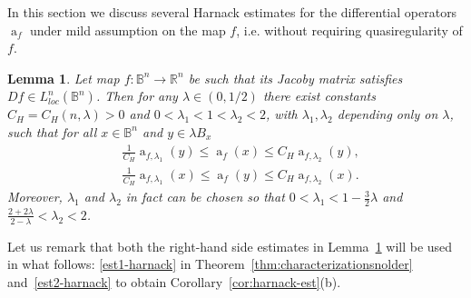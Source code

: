 \documentclass[11pt,a4paper,reqno]{amsart}
\newtheorem{lem}[theorem]{Lemma}
\theoremstyle{definition}
\renewcommand{\a}{\operatorname{a}}
\newcommand{\B}{\mathbb{B}^n}
\newcommand{\R}{\mathbb{R}}
\numberwithin{komcounter}{section}
\begin{document}
In this section we discuss several Harnack estimates for the differential operators $\a_f$ under mild assumption on the map $f$, i.e. without requiring quasiregularity of $f$. 

\begin{lem}\label{lem:harnack}
	Let map $f:\B\rightarrow \R^n$ be such that its Jacoby matrix satisfies ${D\!f \in L^n_{loc}(\B)}$. Then for any $\lambda \in (0,1/2 )$ there exist constants $C_H=C_H(n, \lambda)>0$ and $0<\lambda_1<1<\lambda_2<2$, with $\lambda_1, \lambda_2$ depending only on $\lambda$, such that for all $x\in\B$ and $y\in\lambda B_x$
	\begin{align}
		& \frac{1}{C_H} \a_{f,\lambda_1}(y)\leq \a_f(x)\leq C_H\a_{f,\lambda_2}(y), \label{est1-harnack}\\
		& \frac{1}{C_H} \a_{f,\lambda_1}(x)\leq \a_f(y)\leq C_H\a_{f,\lambda_2}(x). \label{est2-harnack}
	\end{align}
Moreover, $\lambda_1$ and $\lambda_2$ in fact can be chosen so that $0<\lambda_1<1-\frac32\lambda$ and $\frac{2+2\lambda}{2-\lambda}<\lambda_2<2$.
\end{lem}

Let us remark that both the right-hand side estimates in Lemma~\ref{lem:harnack} will be used in what follows: \eqref{est1-harnack} in Theorem~\ref{thm:characterizationsnolder} and~\eqref{est2-harnack} to obtain Corollary~\ref{cor:harnack-est}(b).
\end{document}
